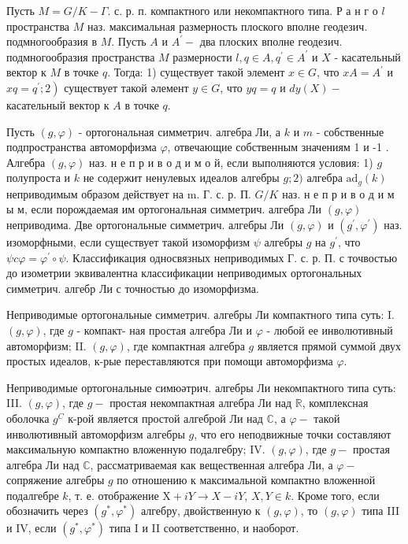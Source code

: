 \documentclass[10pt]{article}
\begin{document}
Пусть $M=G / K-\Gamma$. с. р. п. компактного или некомпактного типа. Р а н г о $l$ пространства $M$ наз. максимальная размерность плоского вполне геодезич. подмногообразия в $M$. Пусть $A$ и $A^{\prime}-$ два плоских вполне геодезич. подмногообразия пространства $M$ размерности $l, q \in A, q^{\prime} \in A^{\prime}$ и $X$ - касательный вектор к $M$ в точке $q$. Тогда: 1) существует такой элемент $x \in G$, что $x A=A^{\prime}$ и $\left.x q=q^{\prime} ; 2\right)$ существует такой әлемент $y \in G$, что $y q=q$ и $d y(X)-$ касательный вектор к $A$ в точке $q$.



Пусть $(g, \varphi)$ - ортогональная симметрич. алгебра Ли, а $k$ и $m$ - собственные подпространства автоморфизма $\varphi$, отвечающие собственным значениям 1 и -1 . Алгебра $(g, \varphi)$ наз. н е п р и в о д и м о й, если выполняются условия: 1) $g$ полупроста и $k$ не содержит ненулевых идеалов алгебры $g ; 2)$ алгебра $\mathrm{ad}_{g}(k)$ неприводимым образом действует на m. Г. с. р. П. $G / K$ наз. н е п р и в о д и м ы м, если порождаемая им ортогональная симметрич. алгебра Ли $(g, \varphi)$ неприводима. Две ортогональные симметрич. алгебры Ли $(g, \varphi)$ и $\left(g^{\prime}, \varphi^{\prime}\right)$ наз. изоморфными, если существует такой изоморфизм $\psi$ алгебры $g$ на $g^{\prime}$, что $\psi c \varphi=\varphi^{\prime} \circ \psi$. Классификация односвязных неприводимых Г. с. р. П. с точвостью до изометрии эквивалентна классификации неприводимых ортогональных симметрич. алгебр Ли с точностью до изоморфизма.



Неприводимые ортогональные симметрич. алгебры Ли компактного типа суть: I. $(g, \varphi)$, где $g$ - компакт- ная простая алгебра Ли и $\varphi$ - любой ее инволютивный автоморфизм; II. $(g, \varphi)$, где компактная алгебра $g$ является прямой суммой двух простых идеалов, к-рые переставляются при помощи автоморфизма $\varphi$.



Неприводимые ортогональные симюәтрич. алгебры Ли некомпактного типа суть: III. $(g, \varphi)$, где $g-$ простая некомпактная алгебра Ли над $\mathbb{R}$, комплексная оболочка $g^{C}$ к-рой является простой алгеброй Ли над $\mathbb{C}$, а $\varphi-$ такой инволютивный автоморфизм алгебры $g$, что его неподвижные точки составляют максимальную компактно вложенную подалгебру; IV. $(g, \varphi)$, где $g-$ простая алгебра Ли над $\mathbb{C}$, рассматриваемая как вещественная алгебра Ли, а $\varphi-$ сопряжение алгебры $g$ по отношению к максимальной компактно вложенной подалгебре $k$, т. е. отображение $\mathrm{X}+i Y \rightarrow X-i Y$, $X, Y \in k$. Кроме того, если обозначить через $\left(g^{*}, \varphi^{*}\right)$ алгебру, двойственную к $(g, \varphi)$, то $(g, \varphi)$ типа III и IV, если $\left(g^{*}, \varphi^{*}\right)$ типа I и II соответственно, и наоборот.
\end{document}
